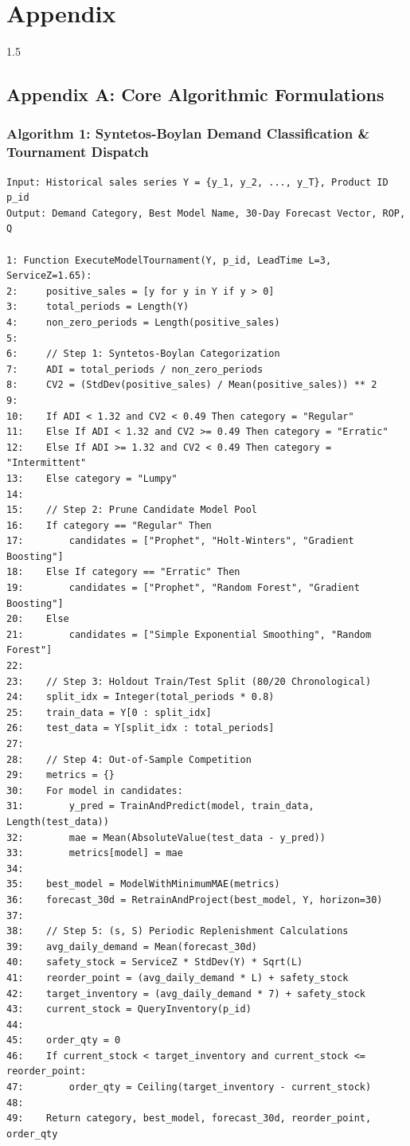 \chapter*{Appendix}
\begin{spacing}{1.5}

\section*{Appendix A: Core Algorithmic Formulations}

\subsection*{Algorithm 1: Syntetos-Boylan Demand Classification \& Tournament Dispatch}
\begin{verbatim}
Input: Historical sales series Y = {y_1, y_2, ..., y_T}, Product ID p_id
Output: Demand Category, Best Model Name, 30-Day Forecast Vector, ROP, Q

1: Function ExecuteModelTournament(Y, p_id, LeadTime L=3, ServiceZ=1.65):
2:     positive_sales = [y for y in Y if y > 0]
3:     total_periods = Length(Y)
4:     non_zero_periods = Length(positive_sales)
5:     
6:     // Step 1: Syntetos-Boylan Categorization
7:     ADI = total_periods / non_zero_periods
8:     CV2 = (StdDev(positive_sales) / Mean(positive_sales)) ** 2
9:     
10:    If ADI < 1.32 and CV2 < 0.49 Then category = "Regular"
11:    Else If ADI < 1.32 and CV2 >= 0.49 Then category = "Erratic"
12:    Else If ADI >= 1.32 and CV2 < 0.49 Then category = "Intermittent"
13:    Else category = "Lumpy"
14:    
15:    // Step 2: Prune Candidate Model Pool
16:    If category == "Regular" Then
17:        candidates = ["Prophet", "Holt-Winters", "Gradient Boosting"]
18:    Else If category == "Erratic" Then
19:        candidates = ["Prophet", "Random Forest", "Gradient Boosting"]
20:    Else
21:        candidates = ["Simple Exponential Smoothing", "Random Forest"]
22:        
23:    // Step 3: Holdout Train/Test Split (80/20 Chronological)
24:    split_idx = Integer(total_periods * 0.8)
25:    train_data = Y[0 : split_idx]
26:    test_data = Y[split_idx : total_periods]
27:    
28:    // Step 4: Out-of-Sample Competition
29:    metrics = {}
30:    For model in candidates:
31:        y_pred = TrainAndPredict(model, train_data, Length(test_data))
32:        mae = Mean(AbsoluteValue(test_data - y_pred))
33:        metrics[model] = mae
34:        
35:    best_model = ModelWithMinimumMAE(metrics)
36:    forecast_30d = RetrainAndProject(best_model, Y, horizon=30)
37:    
38:    // Step 5: (s, S) Periodic Replenishment Calculations
39:    avg_daily_demand = Mean(forecast_30d)
40:    safety_stock = ServiceZ * StdDev(Y) * Sqrt(L)
41:    reorder_point = (avg_daily_demand * L) + safety_stock
42:    target_inventory = (avg_daily_demand * 7) + safety_stock
43:    current_stock = QueryInventory(p_id)
44:    
45:    order_qty = 0
46:    If current_stock < target_inventory and current_stock <= reorder_point:
47:        order_qty = Ceiling(target_inventory - current_stock)
48:        
49:    Return category, best_model, forecast_30d, reorder_point, order_qty
\end{verbatim}


\end{spacing}
